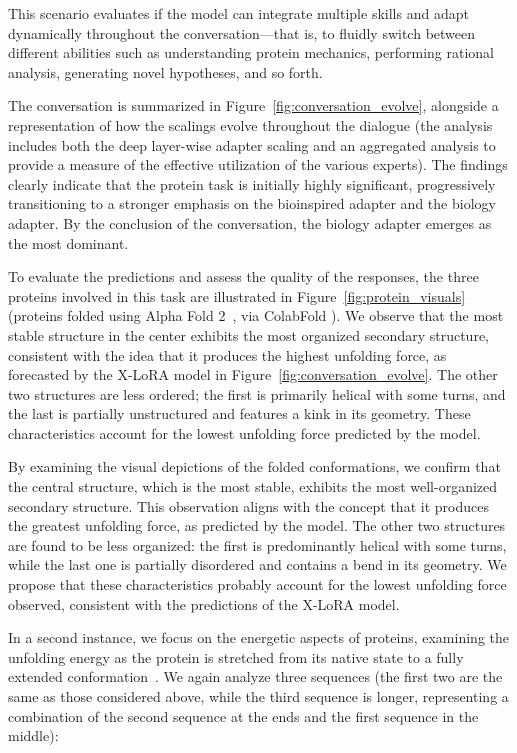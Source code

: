 This scenario evaluates if the model can integrate multiple skills and adapt dynamically throughout the conversation—that is, to fluidly switch between different abilities such as understanding protein mechanics, performing rational analysis, generating novel hypotheses, and so forth.

The conversation is summarized in Figure~\ref{fig:conversation_evolve}, alongside a representation of how the scalings evolve throughout the dialogue (the analysis includes both the deep layer-wise adapter scaling and an aggregated analysis to provide a measure of the effective utilization of the various experts). The findings clearly indicate that the protein task is initially highly significant, progressively transitioning to a stronger emphasis on the bioinspired adapter and the biology adapter. By the conclusion of the conversation, the biology adapter emerges as the most dominant.

To evaluate the predictions and assess the quality of the responses, the three proteins involved in this task are illustrated in Figure~\ref{fig:protein_visuals} (proteins folded using Alpha Fold 2~\cite{Jumper2021HighlyAlphaFoldb}, via ColabFold \cite{Mirdita2022ColabFold:All}). We observe that the most stable structure in the center exhibits the most organized secondary structure, consistent with the idea that it produces the highest unfolding force, as forecasted by the X-LoRA model in Figure~\ref{fig:conversation_evolve}. The other two structures are less ordered; the first is primarily helical with some turns, and the last is partially unstructured and features a kink in its geometry. These characteristics account for the lowest unfolding force predicted by the model.

By examining the visual depictions of the folded conformations, we confirm that the central structure, which is the most stable, exhibits the most well-organized secondary structure. This observation aligns with the concept that it produces the greatest unfolding force, as predicted by the model. The other two structures are found to be less organized: the first is predominantly helical with some turns, while the last one is partially disordered and contains a bend in its geometry. We propose that these characteristics probably account for the lowest unfolding force observed, consistent with the predictions of the X-LoRA model.

In a second instance, we focus on the energetic aspects of proteins, examining the unfolding energy as the protein is stretched from its native state to a fully extended conformation~\cite{Ni2023ForceGen:Model}. We again analyze three sequences (the first two are the same as those considered above, while the third sequence is longer, representing a combination of the second sequence at the ends and the first sequence in the middle):

